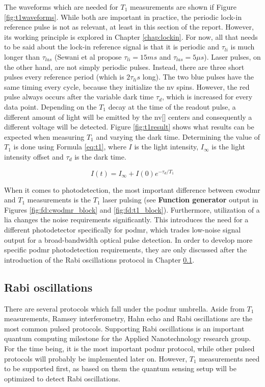 The waveforms which are needed for $T_1$ measurements are shown if Figure \ref{fig:t1waveforms}. While both are important in practice, the periodic lock-in reference pulse is not as relevant, at least in this section of the report. However, its working principle is explored in Chapter \ref{chap:lockin}. For now, all that needs to be said about the lock-in reference signal is that it is periodic and $\tau_{li}$ is much longer than $\tau_{las}$ (Sewani et al \cite{sewani2020coherent} propose $\tau_{li} = 15 ms$ and $\tau_{las} = 5 \mu s$). Laser pulses, on the other hand, are not simply periodic pulses. Instead, there are three short pulses every reference period (which is $2\tau_{li} s$ long). The two blue pulses have the same timing every cycle, because they initialize the \gls{nv} spins. However, the red pulse always occurs after the variable dark time $\tau_d$, which is increased for every data point. Depending on the $T_1$ decay at the time of the readout pulse, a different amount of light will be emitted by the \gls{nv}[] centers and consequently a different voltage will be detected. Figure \ref{fig:t1result} shows what results can be expected when measuring $T_1$ and varying the dark time. Determining the value of $T_1$ is done using Formula \ref{eq:t1}, where $I$ is the light intensity, $I_\infty$ is the light intensity offset and $\tau_d$ is the dark time. 

\begin{equation}\label{eq:t1}
I(t)=I_\infty+I(0)e^{-\tau_d/T_1}
\end{equation}


When it comes to photodetection, the most important difference between \gls{cwodmr} and $T_1$ measurements is the $T_1$ laser pulsing (see \textbf{Function generator} output in Figures \ref{fig:fd:cwodmr_block} and \ref{fig:fd:t1_block}). Furthermore, utilization of a \gls{lia} changes the noise requirements significantly. This introduces the need for a different photodetector specifically for \gls{podmr}, which trades low-noise signal output for a broad-bandwidth optical pulse detection. In order to develop more specific \gls{podmr} photodetection requirements, they are only discussed after the introduction of the Rabi oscillations protocol in Chapter \ref{chap:fd:podmr}.


\subsection{Rabi oscillations}\label{chap:fd:podmr}
There are several protocols which fall under the \gls{podmr} umbrella. Aside from $T_1$ measurements, Ramsey interferometry, Hahn echo and Rabi oscillations are the most common pulsed protocols. Supporting Rabi oscillations is an important quantum computing milestone for the Applied Nanotechnology research group. For the time being, it is the most important \gls{podmr} protocol, while other pulsed protocols will probably be implemented later on. However, $T_1$ measurements need to be supported first, as based on them the quantum sensing setup will be optimized to detect Rabi oscillations.


